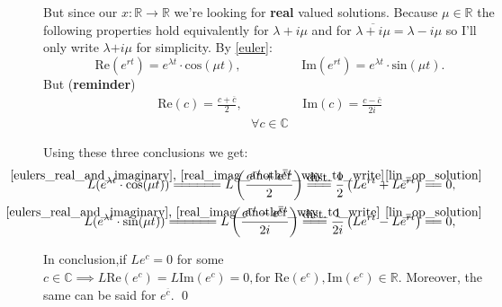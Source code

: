 But since our $x : \mathbb{R} \rightarrow \mathbb{R}$ we're looking for \textbf{real} valued solutions.
Because $\mu \in \mathbb{R}$ the following properties hold equivalently for $\lambda + i\mu$ and for $\overline{\lambda + i\mu}=\lambda - i\mu$ so I'll only write $\lambda \textbf{+} i \mu$ for simplicity.
By \ref{euler}:
\begin{equation}\label{eulers_real_and_imaginary}
    \text{Re}(e^{rt})=e^{\lambda t} \cdot \text{cos}(\mu t), \hspace{2cm}    \text{Im}(e^{rt}) = e^{\lambda t} \cdot \text{sin}(\mu t).
\end{equation}
But (\textbf{reminder})
\begin{gather}\label{real_imag_another_way_to_write}
    \text{Re}(c)= \frac{c+\overline{c}}{2}, \hspace{2cm}
    \text{Im}(c) = \frac{c-\overline{c}}{2i}
\end{gather}
\begin{gather*}
    \forall c \in \mathbb{C}
\end{gather*}

\newcommand\firstConclusion{\stackrel{\mathclap{\normalfont\mbox{\ref{eulers_real_and_imaginary}, \ref{real_imag_another_way_to_write}}}}{=\joinrel=\joinrel=\joinrel=\joinrel=\joinrel=}}

\newcommand\byDistributivity{\stackrel{\mathclap{\normalfont\mbox{dist.}}}{=\joinrel=\joinrel=}}

\newcommand\operatorSatisfy{\stackrel{\mathclap{\normalfont\mbox{\ref{lin_op_solution}}}}{=\joinrel=}}

Using these three conclusions we get:
\begin{align*}
    L(e^{\lambda t} \cdot \text{cos}(\mu t)) \firstConclusion
    L\left(\frac{e^{rt}+e^{\overline{r}t}}{2} \right) \byDistributivity
    \frac{1}{2} \left( Le^{rt} + Le^{\overline{r}t} \right) \operatorSatisfy 0 , \\
    L(e^{\lambda t} \cdot \text{sin}(\mu t)) \firstConclusion
    L\left(\frac{e^{rt}-e^{\overline{r}t}}{2i} \right) \byDistributivity
    \frac{1}{2i} \left( Le^{rt} - Le^{\overline{r}t} \right) \operatorSatisfy 0 ,
\end{align*}

In conclusion,if $Le^c=0$ for some $c \in \mathbb{C} \implies L\text{Re}(e^c)= L\text{Im}(e^c)=0, \text{for } \text{Re}(e^c), \text{Im}(e^c) \in \mathbb{R}$.
Moreover, the same can be said for $e^{\overline{c}}$. \qed \\


